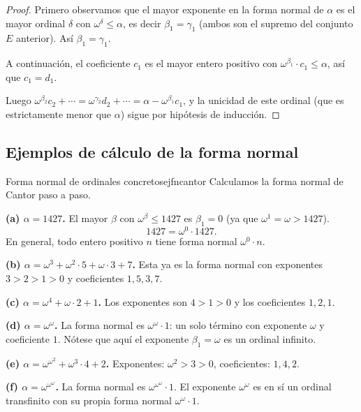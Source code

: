 \begin{proof}
Primero observamos que el mayor exponente en la forma normal de $\alpha$ es el mayor ordinal $\delta$ con $\omega^\delta \leq \alpha$, es decir $\beta_1 = \gamma_1$ (ambos son el supremo del conjunto $E$ anterior). Así $\beta_1 = \gamma_1$.

A continuación, el coeficiente $c_1$ es el mayor entero positivo con $\omega^{\beta_1} \cdot c_1 \leq \alpha$, así que $c_1 = d_1$.

Luego $\omega^{\beta_2} c_2 + \cdots = \omega^{\gamma_2} d_2 + \cdots = \alpha - \omega^{\beta_1}c_1$, y la unicidad de este ordinal (que es estrictamente menor que $\alpha$) sigue por hipótesis de inducción.
\end{proof}

\subsection{Ejemplos de cálculo de la forma normal}

\begin{ejemplo}{Forma normal de ordinales concretos}{ejfncantor}
Calculamos la forma normal de Cantor paso a paso.

\textbf{(a) $\alpha = 1427$.} El mayor $\beta$ con $\omega^\beta \leq 1427$ es $\beta_1 = 0$ (ya que $\omega^1 = \omega > 1427$).
\[
  1427 = \omega^0 \cdot 1427.
\]
En general, todo entero positivo $n$ tiene forma normal $\omega^0 \cdot n$.

\textbf{(b) $\alpha = \omega^3 + \omega^2 \cdot 5 + \omega \cdot 3 + 7$.} Esta ya es la forma normal con exponentes $3 > 2 > 1 > 0$ y coeficientes $1, 5, 3, 7$.

\textbf{(c) $\alpha = \omega^4 + \omega \cdot 2 + 1$.} Los exponentes son $4 > 1 > 0$ y los coeficientes $1, 2, 1$.

\textbf{(d) $\alpha = \omega^\omega$.} La forma normal es $\omega^\omega \cdot 1$: un solo término con exponente $\omega$ y coeficiente $1$. Nótese que aquí el exponente $\beta_1 = \omega$ es un ordinal infinito.

\textbf{(e) $\alpha = \omega^{\omega^2} + \omega^3 \cdot 4 + 2$.} Exponentes: $\omega^2 > 3 > 0$, coeficientes: $1, 4, 2$.

\textbf{(f) $\alpha = \omega^{\omega^\omega}$.} La forma normal es $\omega^{\omega^\omega} \cdot 1$. El exponente $\omega^\omega$ es en sí un ordinal transfinito con su propia forma normal $\omega^\omega \cdot 1$.
\end{ejemplo}

